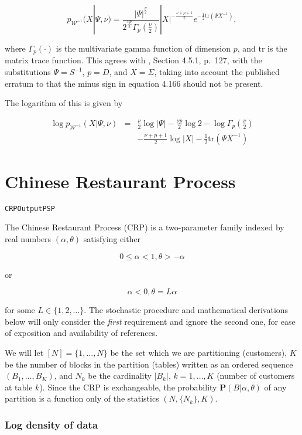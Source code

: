 \documentclass[12pt]{article}
\newcommand{\W}{\mathcal{W}}
\newcommand{\tr}{\mathrm{tr}}
\begin{document}
\[ p_{\W^{-1}}(X|\Psi, \nu) =
 \frac{|\Psi|^{\frac{\nu}{2}}}{2^{\frac{\nu p}{2}} \Gamma_p\left(\frac{\nu}{2}\right)}
 |X|^{-\frac{\nu + p + 1}{2}} e^{-\frac{1}{2} \tr(\Psi X^{-1})}, \]

where $\Gamma_p(\cdot)$ is the multivariate gamma function of
dimension $p$, and $\tr$ is the matrix trace function.  This agrees
with \cite{murphy}, Section 4.5.1, p.\ 127, with the substitutions
$\Psi = S^{-1}$, $p = D$, and $X = \Sigma$, taking into account the
published erratum to \cite{murphy} that the minus sign in equation
4.166 should not be present.

The logarithm of this is given by

\begin{eqnarray*}
 \log p_{\W^{-1}}(X|\Psi, \nu) & = &
 \frac{\nu}{2} \log |\Psi| - \frac{\nu p}{2} \log 2 - \log \Gamma_p \left(\frac{\nu}{2}\right) \\
 & & -\frac{\nu + p + 1}{2} \log |X| - \frac{1}{2}\tr(\Psi X^{-1})
\end{eqnarray*}

\section{Chinese Restaurant Process}

\texttt{CRPOutputPSP}

The Chinese Restaurant Process (CRP) is a two-parameter family indexed by
real numbers $(\alpha, \theta)$ satisfying either

\[
0 \le \alpha < 1, \theta > - \alpha
\]

or

\[
\alpha < 0, \theta = L\alpha
\]

for some $L \in \{1,2,\dots\}$. The stochastic procedure and mathematical
derivations below will only consider the \textit{first} requirement and
ignore the second one, for ease of exposition and availability of references.

We will let $[N] = \{1,\dots,N\}$ be the set which we are partitioning (customers),
$K$ be the number of blocks in the partition (tables) written as an ordered sequence
$(B_1,\dots,B_K)$, and $N_k$ be the cardinality $|B_k|$, $k = 1,\dots,K$
(number of customers at table $k$). Since the CRP is exchangeable, the probability
$\mathbf{P}(B|\alpha,\theta)$ of any partition is a function only of the statistics
$(N,\{N_k\},K)$.

\subsubsection{Log density of data}
\end{document}
